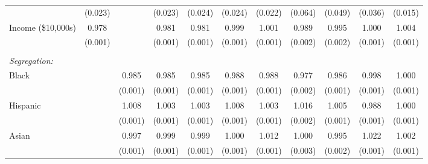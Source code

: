 {\begin{tabular}{l*{10}{c}}
                    &     (0.023)         &                     &     (0.023)         &     (0.024)         &     (0.024)         &     (0.022)         &     (0.064)         &     (0.049)         &     (0.036)         &     (0.015)         \\
Income (\$10,000s)  &       0.978\sym{***}&                     &       0.981\sym{***}&       0.981\sym{***}&       0.999         &       1.001         &       0.989\sym{***}&       0.995\sym{**} &       1.000         &       1.004\sym{***}\\
                    &     (0.001)         &                     &     (0.001)         &     (0.001)         &     (0.001)         &     (0.001)         &     (0.002)         &     (0.002)         &     (0.001)         &     (0.001)         \\
& & & & & \\ 
 \emph{Segregation:} & & & & & \\ 
Black               &                     &       0.985\sym{***}&       0.985\sym{***}&       0.985\sym{***}&       0.988\sym{***}&       0.988\sym{***}&       0.977\sym{***}&       0.986\sym{***}&       0.998         &       1.000         \\
                    &                     &     (0.001)         &     (0.001)         &     (0.001)         &     (0.001)         &     (0.001)         &     (0.002)         &     (0.001)         &     (0.001)         &     (0.001)         \\
Hispanic            &                     &       1.008\sym{***}&       1.003\sym{***}&       1.003\sym{***}&       1.008\sym{***}&       1.003\sym{***}&       1.016\sym{***}&       1.005\sym{***}&       0.988\sym{***}&       1.000         \\
                    &                     &     (0.001)         &     (0.001)         &     (0.001)         &     (0.001)         &     (0.001)         &     (0.002)         &     (0.001)         &     (0.001)         &     (0.001)         \\
Asian               &                     &       0.997\sym{***}&       0.999         &       0.999         &       1.000         &       1.012\sym{***}&       1.000         &       0.995\sym{*}  &       1.022\sym{***}&       1.002\sym{*}  \\
                    &                     &     (0.001)         &     (0.001)         &     (0.001)         &     (0.001)         &     (0.001)         &     (0.003)         &     (0.002)         &     (0.001)         &     (0.001)         \\

\end{tabular}}
